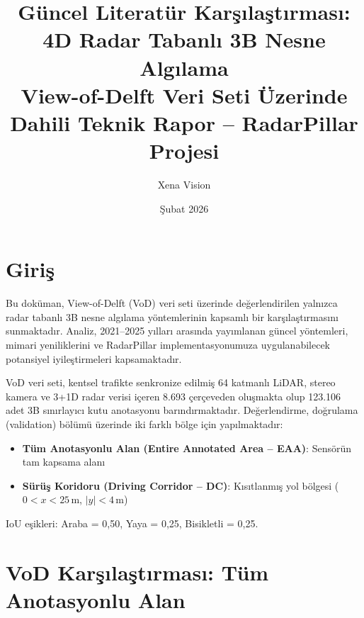 \documentclass[a4paper,11pt]{article}
\title{
    \vspace{-1cm}
    \textbf{Güncel Literatür Karşılaştırması:\\
    4D Radar Tabanlı 3B Nesne Algılama\\View-of-Delft Veri Seti Üzerinde}\\[0.5em]
    \large Dahili Teknik Rapor -- RadarPillar Projesi
}
\author{Xena Vision}
\date{Şubat 2026}
\begin{document}
\maketitle
\thispagestyle{empty}

\section{Giriş}

Bu doküman, View-of-Delft (VoD) veri seti üzerinde değerlendirilen yalnızca radar tabanlı 3B nesne algılama yöntemlerinin kapsamlı bir karşılaştırmasını sunmaktadır. Analiz, 2021--2025 yılları arasında yayımlanan güncel yöntemleri, mimari yeniliklerini ve RadarPillar implementasyonumuza uygulanabilecek potansiyel iyileştirmeleri kapsamaktadır.

VoD veri seti, kentsel trafikte senkronize edilmiş 64 katmanlı LiDAR, stereo kamera ve 3+1D radar verisi içeren 8.693 çerçeveden oluşmakta olup 123.106 adet 3B sınırlayıcı kutu anotasyonu barındırmaktadır. Değerlendirme, doğrulama (validation) bölümü üzerinde iki farklı bölge için yapılmaktadır:
\begin{itemize}[nosep]
    \item \textbf{Tüm Anotasyonlu Alan (Entire Annotated Area -- EAA)}: Sensörün tam kapsama alanı
    \item \textbf{Sürüş Koridoru (Driving Corridor -- DC)}: Kısıtlanmış yol bölgesi ($0 < x < 25$\,m, $|y| < 4$\,m)
\end{itemize}

IoU eşikleri: Araba = 0{,}50, Yaya = 0{,}25, Bisikletli = 0{,}25.

\section{VoD Karşılaştırması: Tüm Anotasyonlu Alan}
\end{document}
